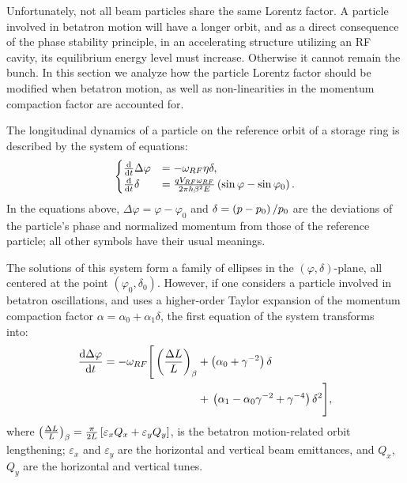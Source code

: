 \documentclass[a4paper]{jacow}
\newcommand{\w}{\omega}
\newcommand{\D}{\Delta}
\begin{document}
Unfortunately, not all beam particles share the same Lorentz factor. A particle involved in betatron
motion will have a longer orbit, and as a direct consequence of the phase stability principle,
in an accelerating structure utilizing an RF cavity, its equilibrium energy level 
must increase. Otherwise it cannot remain the bunch. In this section we analyze how the particle Lorentz factor
should be modified when betatron motion, as well as non-linearities in the momentum compaction factor are
accounted for.

The longitudinal dynamics of a particle on the reference orbit of a storage ring is described
by the system of equations:
\begin{equation}
  \begin{cases}
    \ddt{}\D\varphi &= -\w_{RF}\eta\delta, \\
    \ddt{}\delta &= \frac{q V_{RF}\w_{RF}}{2\pi h\beta^2E}\bkt{\sin\varphi - \sin\varphi_0}.
  \end{cases}
\end{equation}
In the equations above, $\D\varphi = \varphi - \varphi_0$ and
$\delta = \bkt{p-p_0}/{p_0}$ are the deviations of the particle's phase and
normalized momentum from those of the reference particle; all other symbols have their usual meanings.

The solutions of this system form a family of ellipses in the $(\varphi, \delta)$-plane, all centered at the
point $(\varphi_0,\delta_0)$. However, if one considers a particle involved in betatron oscillations, and
uses a higher-order Taylor expansion of the momentum compaction factor
$\alpha = \alpha_0 + \alpha_1\delta$, the first equation of the system
transforms into:~\cite[p.~2579]{Senichev:IPAC13}
\begin{align*}
  \ddt{\D\varphi} = -\w_{RF} \Bigg[\bkt{\frac{\Delta L}{L}}_\beta &+ \bkt{\alpha_0 + \gamma^{-2}}\delta \Bigg.\\
    &+ \Bigg.\bkt{\alpha_1 - \alpha_0\gamma^{-2} + \gamma^{-4}}\delta^2\Bigg],
\end{align*}
where $\bkt{\frac{\Delta L}{L}}_\beta = \frac{\pi}{2L}\bkt*{\varepsilon_xQ_x + \varepsilon_yQ_y}$, is
the betatron motion-related orbit lengthening; $\varepsilon_x$ and $\varepsilon_y$ are
the horizontal and vertical beam emittances, and $Q_x$, $Q_y$ are the horizontal and vertical tunes.
\end{document}

